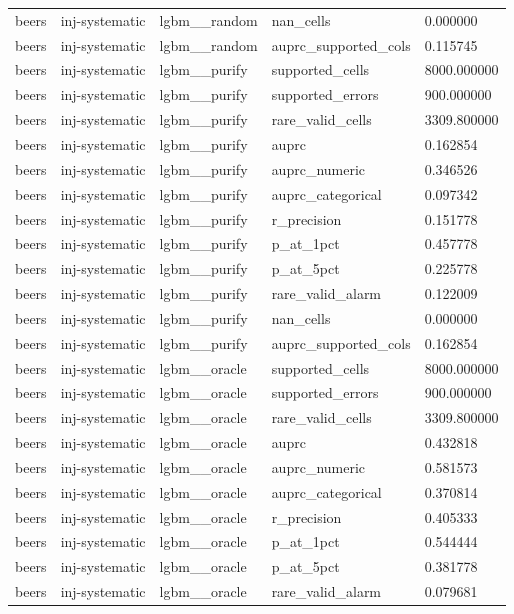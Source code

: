 \begin{tabular}{lllll}
beers & inj-systematic & lgbm\_\_random & nan\_cells & 0.000000 \\
beers & inj-systematic & lgbm\_\_random & auprc\_supported\_cols & 0.115745 \\
beers & inj-systematic & lgbm\_\_purify & supported\_cells & 8000.000000 \\
beers & inj-systematic & lgbm\_\_purify & supported\_errors & 900.000000 \\
beers & inj-systematic & lgbm\_\_purify & rare\_valid\_cells & 3309.800000 \\
beers & inj-systematic & lgbm\_\_purify & auprc & 0.162854 \\
beers & inj-systematic & lgbm\_\_purify & auprc\_numeric & 0.346526 \\
beers & inj-systematic & lgbm\_\_purify & auprc\_categorical & 0.097342 \\
beers & inj-systematic & lgbm\_\_purify & r\_precision & 0.151778 \\
beers & inj-systematic & lgbm\_\_purify & p\_at\_1pct & 0.457778 \\
beers & inj-systematic & lgbm\_\_purify & p\_at\_5pct & 0.225778 \\
beers & inj-systematic & lgbm\_\_purify & rare\_valid\_alarm & 0.122009 \\
beers & inj-systematic & lgbm\_\_purify & nan\_cells & 0.000000 \\
beers & inj-systematic & lgbm\_\_purify & auprc\_supported\_cols & 0.162854 \\
beers & inj-systematic & lgbm\_\_oracle & supported\_cells & 8000.000000 \\
beers & inj-systematic & lgbm\_\_oracle & supported\_errors & 900.000000 \\
beers & inj-systematic & lgbm\_\_oracle & rare\_valid\_cells & 3309.800000 \\
beers & inj-systematic & lgbm\_\_oracle & auprc & 0.432818 \\
beers & inj-systematic & lgbm\_\_oracle & auprc\_numeric & 0.581573 \\
beers & inj-systematic & lgbm\_\_oracle & auprc\_categorical & 0.370814 \\
beers & inj-systematic & lgbm\_\_oracle & r\_precision & 0.405333 \\
beers & inj-systematic & lgbm\_\_oracle & p\_at\_1pct & 0.544444 \\
beers & inj-systematic & lgbm\_\_oracle & p\_at\_5pct & 0.381778 \\
beers & inj-systematic & lgbm\_\_oracle & rare\_valid\_alarm & 0.079681 \\

\end{tabular}
